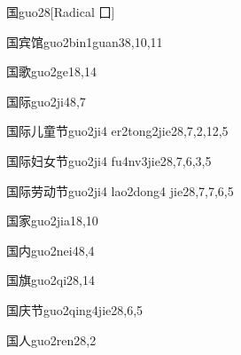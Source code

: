 \begin{verbete}{国}{guo2}{8}[Radical ⼞]
\end{verbete}

\begin{verbete}{国宾馆}{guo2bin1guan3}{8,10,11}
\end{verbete}

\begin{verbete}{国歌}{guo2ge1}{8,14}
\end{verbete}

\begin{verbete}{国际}{guo2ji4}{8,7}
\end{verbete}

\begin{verbete}{国际儿童节}{guo2ji4 er2tong2jie2}{8,7,2,12,5}
\end{verbete}

\begin{verbete}{国际妇女节}{guo2ji4 fu4nv3jie2}{8,7,6,3,5}
\end{verbete}

\begin{verbete}{国际劳动节}{guo2ji4 lao2dong4 jie2}{8,7,7,6,5}
\end{verbete}

\begin{verbete}{国家}{guo2jia1}{8,10}
\end{verbete}

\begin{verbete}{国内}{guo2nei4}{8,4}
\end{verbete}

\begin{verbete}{国旗}{guo2qi2}{8,14}
\end{verbete}

\begin{verbete}{国庆节}{guo2qing4jie2}{8,6,5}
\end{verbete}

\begin{verbete}{国人}{guo2ren2}{8,2}
\end{verbete}

